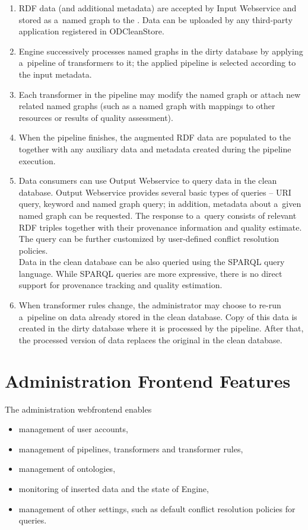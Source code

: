 \begin{enumerate}
  \item RDF data (and additional metadata) are accepted by Input Webservice and stored as a~named graph to the . Data can be uploaded by any third-party application registered in ODCleanStore.
  \item Engine successively processes named graphs in the dirty database by applying a~pipeline of transformers to it; the applied pipeline is selected according to the input metadata.
  \item Each transformer in the pipeline may modify the named graph or attach new related named graphs (such as a named graph with mappings to other resources or results of quality assessment).
  \item When the pipeline finishes, the augmented RDF data are populated to the  together with any auxiliary data and metadata created during the pipeline execution.
  \item Data consumers can use Output Webservice to query data in the clean database. Output Webservice provides several basic types of queries -- URI query, keyword and named graph query; in addition, metadata about a~given named graph can be requested. The response to a~query consists of relevant RDF triples together with their provenance information and quality estimate. The query can be further customized by user-defined conflict resolution policies.\\
	Data in the clean database can be also queried using the SPARQL query language. While SPARQL queries are more expressive, there is no direct support for provenance tracking and quality estimation. 
  \item When transformer rules change, the administrator may choose to re-run a~pipeline on data already stored in the clean database. Copy of this data is created in the dirty database where it is processed by the pipeline. After that, the processed version of data replaces the original in the clean database.
\end{enumerate}

\section{Administration Frontend Features}
The administration webfrontend enables
\begin{itemize}
  \item management of user accounts,
  \item management of pipelines, transformers and transformer rules,
  \item management of ontologies,
  \item monitoring of inserted data and the state of Engine,
  \item management of other settings, such as default conflict resolution policies for queries.  
\end{itemize}

